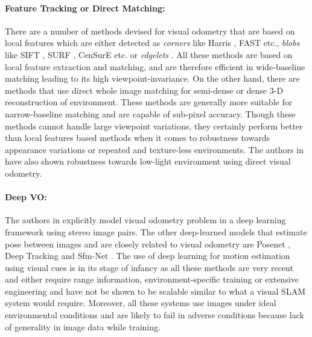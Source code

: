 \documentclass{article}
\begin{document}
\paragraph{Feature Tracking or Direct Matching:} There are a number of methods devised for visual odometry that are based on local features which are either detected as \emph{corners} like Harris \cite{Harris1988}, FAST \cite{EdwardRosten} etc., \emph{blobs} like SIFT \cite{Lowe2004}, SURF \cite{Bay2008}, CenSurE \cite{Forsyth2008} etc. or \emph{edgelets} \cite{klein2008improving}. All these methods are based on local feature extraction and matching, and are therefore efficient in wide-baseline matching leading to its high viewpoint-invariance. On the other hand, there are methods that use direct whole image matching for semi-dense \cite{Forster2014,Engel2013} or dense \cite{Newcombe2011,Tykkala2011} 3-D reconstruction of environment. These methods are generally more suitable for narrow-baseline matching and are capable of sub-pixel accuracy. Though these methods cannot handle large viewpoint variations, they certainly perform better than local features based methods when it comes to robustness towards appearance variations or repeated and texture-less environments. The authors in \cite{alismail2016direct} have also shown robustness towards low-light environment using direct visual odometry.

\paragraph{Deep VO:}
The authors in \cite{konda2015learning} explicitly model visual odometry problem in a deep learning framework using stereo image pairs. The other deep-learned models that estimate pose between images and are closely related to visual odometry are Posenet \cite{kendall2015posenet}, Deep Tracking \cite{dequaire2016deep} and Sfm-Net \cite{vijayanarasimhan2017sfm}. The use of deep learning for motion estimation using visual cues is in its stage of infancy as all these methods are very recent and either require range information, environment-specific training or extensive engineering and have not be shown to be scalable similar to what a visual SLAM system would require. Moreover, all these systems use images under ideal environmental conditions and are likely to fail in adverse conditions because lack of generality in image data while training.
\end{document}
